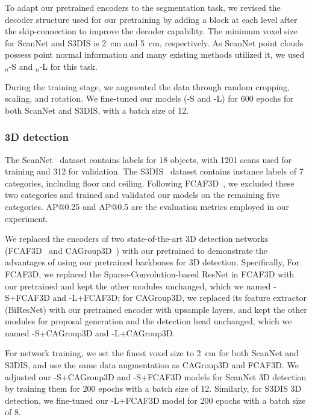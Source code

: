 \documentclass[10pt,twocolumn,letterpaper]{article}
\begin{document}
To adapt our pretrained encoders to the segmentation task, we revised the decoder structure used for our pretraining by adding a {\SST} block at each level after the skip-connection to improve the decoder capability. The minimum voxel size for ScanNet and S3DIS is \SI{2}{cm} and \SI{5}{cm}, respectively. As ScanNet point clouds possess point normal information and many existing methods utilized it, we used \SST$_n$-S and \SST$_n$-L for this task.

 During the training stage, we augmented the data through random cropping, scaling, and rotation. We fine-tuned our models (\SST-S and \SST-L) for 600 epochs for both ScanNet and S3DIS, with a batch size of 12.

\subsubsection{3D detection}

The ScanNet~\cite{dai2017scannet} dataset contains labels for 18 objects, with 1201 scans used for training and 312 for validation. The S3DIS~\cite{S3DIS} dataset contains instance labels of 7 categories, including floor and ceiling. Following FCAF3D~\cite{rukhovich2021fcaf3d}, we excluded these two categories and trained and validated our models on the remaining five categories. AP@0.25 and AP@0.5 are the evaluation metrics employed in our experiment.

We replaced the encoders of two state-of-the-art 3D detection networks (FCAF3D~\cite{rukhovich2021fcaf3d} and CAGroup3D~\cite{wang2022cagroupd}) with our pretrained {\SST} to demonstrate the advantages of using our pretrained backbones for 3D detection. Specifically, For FCAF3D, we replaced the Sparse-Convolution-based ResNet in FCAF3D with our pretrained {\SST} and kept the other modules unchanged, which we named {\SST}-S+FCAF3D and {\SST}-L+FCAF3D; for CAGroup3D, we replaced its feature extractor (BiResNet) with our pretrained encoder with upsample layers, and kept the other modules for proposal generation and the detection head unchanged, which we named {\SST}-S+CAGroup3D and {\SST}-L+CAGroup3D.

For network training, we set the finest voxel size to \SI{2}{cm} for both ScanNet and S3DIS, and use the same data augmentation as CAGroup3D and FCAF3D. We adjusted our \SST-S+CAGroup3D and \SST-S+FCAF3D models for ScanNet 3D detection by training them for 200 epochs with a batch size of 12. Similarly, for S3DIS 3D detection, we fine-tuned our \SST-L+FCAF3D model for 200 epochs with a batch size of 8.
\end{document}
